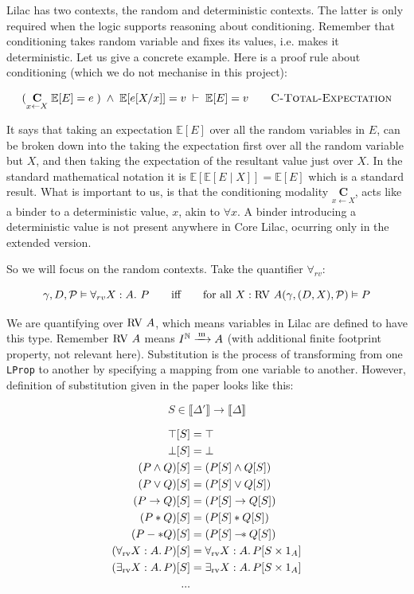 Lilac has two contexts, the random and deterministic contexts. The latter is only required when the logic supports reasoning about conditioning. Remember that conditioning takes random variable
and fixes its values, i.e. makes it deterministic. Let us give a concrete example. Here is a proof rule about conditioning (which we do not mechanise in this project):

\[
(\underset{x \leftarrow X}{\mathbf{C}} \;\mathbb{E}[E] = e\;) \;\land\; \mathbb{E}[e[X/x]] = v \;\vdash\; \mathbb{E}[E] = v\qquad
\textsc{C-Total-Expectation}
\]

It says that taking an expectation $\mathbb{E}[E]$ over all the random variables in $E$, can be broken down into the taking the expectation first over all the random variable but $X$, and then taking the expectation of the
resultant value just over $X$. In the standard mathematical notation it is $\mathbb{E}[\mathbb{E}[E \mid X]] = \mathbb{E}[E]$ which is a standard result. What is important to us, is that the conditioning modality
$\underset{x \leftarrow X}{\mathbf{C}}$, acts like a binder to a deterministic value, $x$, akin to $\forall x$. A binder introducing a deterministic value is not present anywhere in Core Lilac, ocurring only
in the extended version.

So we will focus on the random contexts. Take the quantifier $\forall_{rv}$:

\[
\gamma, D, \mathcal{P} \vDash \forall_{rv} X : A.\ P \qquad \text{iff} \qquad \text{for all } X : \mathrm{RV\ } A (\gamma, (D, X), \mathcal{P}) \vDash P 
\]

We are quantifying over $\mathrm{RV\ } A$, which means variables in Lilac are defined to have this type. Remember $\mathrm{RV\ } A$ means $I^\mathbb{N} \xrightarrow{\,\mathrm{m}\,} A$ (with additional finite footprint property, not relevant here).
Substitution is the process of transforming from one \texttt{LProp} to another by specifying a mapping from one variable to another. However, definition of substitution given in the paper looks like this:

\[
S \in \llbracket \Delta' \rrbracket \to \llbracket \Delta\rrbracket 
\]

\[
\begin{aligned}
\top[S] &= \top \\
\bot[S] &= \bot \\
(P \wedge Q)[S] &= (P[S] \wedge Q[S]) \\
(P \vee Q)[S] &= (P[S] \vee Q[S]) \\
(P \to Q)[S] &= (P[S] \to Q[S]) \\
(P * Q)[S] &= (P[S] * Q[S]) \\
(P -* Q)[S] &= (P[S] \mathbin{-\!*} Q[S]) \\
(\forall_{\mathrm{rv}} X:A.\,P)[S] &= \forall_{\mathrm{rv}} X:A.\,P[S \times 1_A] \\
(\exists_{\mathrm{rv}} X:A.\,P)[S] &= \exists_{\mathrm{rv}} X:A.\,P[S \times 1_A] \\
...
\end{aligned}
\]

